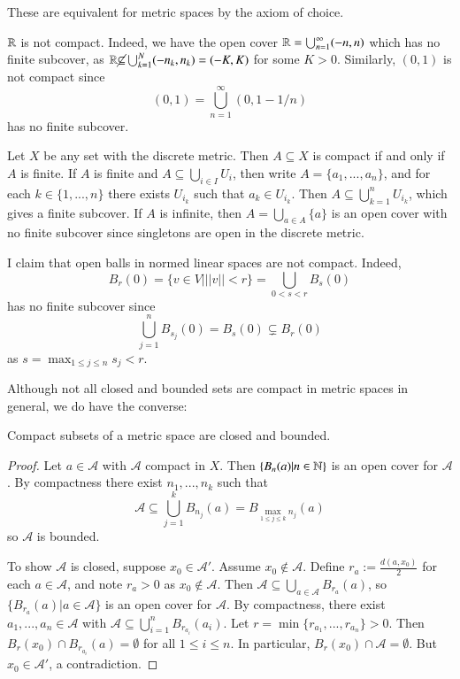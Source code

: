 These are equivalent for metric spaces by the axiom of choice.

\begin{example}
    $\mathbb R$ is not compact. Indeed, we have the open cover $\mathbb R = \bigcup_{n=1}^{\infty}(-n,n)$ which has no finite subcover, as $\mathbb R \cancel{\subseteq} \bigcup_{k=1}^N(-n_k,n_k) = (-K,K)$ for some $K > 0$. Similarly, $(0,1)$ is not compact since $$(0,1) = \bigcup_{n=1}^{\infty}(0,1-1/n)$$ has no finite subcover.
\end{example}

\begin{example}
    Let $X$ be any set with the discrete metric. Then $A \subseteq X$ is compact if and only if $A$ is finite. If $A$ is finite and $A \subseteq \bigcup_{i \in I}U_i$, then write $A = \{a_1,...,a_n\}$, and for each $k \in \{1,...,n\}$ there exists $U_{i_k}$ such that $a_k \in U_{i_k}$. Then $A \subseteq \bigcup_{k=1}^nU_{i_k}$, which gives a finite subcover. If $A$ is infinite, then $A = \bigcup_{a \in A}\{a\}$ is an open cover with no finite subcover since singletons are open in the discrete metric.
\end{example}

\begin{example}
    I claim that open balls in normed linear spaces are not compact. Indeed, $$B_r(0) = \{v \in V\vert ||v|| < r\} = \bigcup_{0 < s < r}B_s(0)$$ has no finite subcover since $$\bigcup_{j=1}^nB_{s_j}(0) = B_s(0) \subsetneq B_r(0)$$ as $s = \max_{1\leq j \leq n}s_j < r$.
\end{example}

Although not all closed and bounded sets are compact in metric spaces in general, we do have the converse:

\begin{proposition}
    Compact subsets of a metric space are closed and bounded.
\end{proposition}
\begin{proof}
     Let $a \in \mathcal{A}$ with $\mathcal{A}$ compact in $X$. Then $\{B_n(a)\vert n \in \mathbb N\}$ is an open cover for $\mathcal{A}$. By compactness there exist $n_1,...,n_k$ such that $$\mathcal{A} \subseteq \bigcup_{j=1}^kB_{n_j}(a) = B_{\max_{1\leq j \leq k}n_j}(a)$$ so $\mathcal{A}$ is bounded.

     To show $\mathcal{A}$ is closed, suppose $x_0 \in \mathcal{A}'$. Assume $x_0 \notin \mathcal{A}$. Define $r_a := \frac{d(a,x_0)}{2}$ for each $a \in \mathcal{A}$, and note $r_a > 0$ as $x_0 \notin \mathcal{A}$. Then $\mathcal{A} \subseteq \bigcup_{a \in \mathcal{A}}B_{r_a}(a)$, so $\{B_{r_a}(a)\vert a \in \mathcal{A}\}$ is an open cover for $\mathcal{A}$. By compactness, there exist $a_1,...,a_n \in \mathcal{A}$ with $\mathcal{A} \subseteq \bigcup_{i=1}^nB_{r_{a_i}}(a_i)$. Let $r = \min\{r_{a_1},...,r_{a_n}\} > 0$. Then $B_r(x_0) \cap B_{r_{a_i}}(a) = \emptyset$ for all $1 \leq i \leq n$. In particular, $B_r(x_0) \cap \mathcal{A} = \emptyset$. But $x_0 \in \mathcal{A}'$, a contradiction.
\end{proof}

